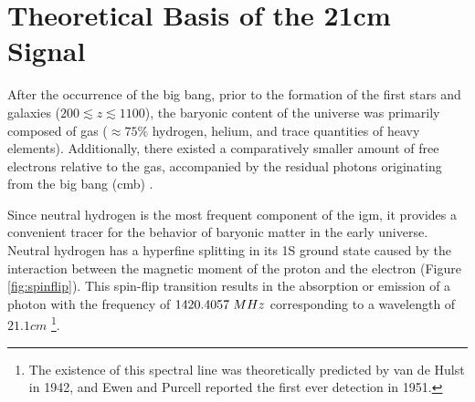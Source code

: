 \documentclass[12pt, TexShade, letterpaper]{report}
\begin{document}
\section{Theoretical Basis of the 21cm Signal}
\label{chap:global21cm,sub:physics}
After the occurrence of the big bang, prior to the formation of the first stars and galaxies ($200 \lesssim z \lesssim 1100$), the baryonic content of the universe was primarily composed of gas ($\approx 75\% $ hydrogen, helium, and trace quantities of heavy elements). Additionally, there existed a comparatively smaller amount of free electrons relative to the gas, accompanied by the residual photons originating from the big bang (\gls{cmb}) \cite{map_universe, 21century}.\par
Since neutral hydrogen is the most frequent component of the \gls{igm}, it provides a convenient tracer for the behavior of baryonic matter in the early universe. Neutral hydrogen has a hyperfine splitting in its 1S ground state caused by the interaction between the magnetic moment of the proton and the electron (Figure \ref{fig:spinflip}). This spin-flip transition results in the absorption or emission of a photon with the frequency of $1420.4057\hspace{0.1cm} MHz$\cite{low_frequency} corresponding to a wavelength of $21.1cm$ \cite{21century} \footnote{The existence of this spectral line was theoretically predicted by van de Hulst in 1942, and Ewen and Purcell reported the first ever detection in 1951\cite{21century}.}.\par
\end{document}

